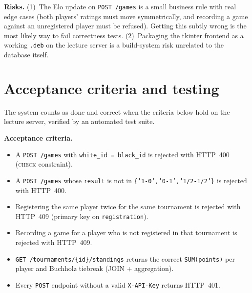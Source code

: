 \documentclass[11pt,a4paper]{article}
\begin{document}
\textbf{Risks.} (1)~The Elo update on \texttt{POST /games} is a small business
rule with real edge cases (both players' ratings must move symmetrically, and
recording a game against an unregistered player must be refused). Getting this
subtly wrong is the most likely way to fail correctness tests.
(2)~Packaging the tkinter frontend as a working \texttt{.deb} on the lecture
server is a build-system risk unrelated to the database itself.

\section{Acceptance criteria and testing}

The system counts as done and correct when the criteria below hold on the
lecture server, verified by an automated test suite.

\textbf{Acceptance criteria.}
\begin{itemize}[topsep=2pt]
  \item A \texttt{POST /games} with \texttt{white\_id = black\_id} is rejected
        with HTTP~400 (\textsc{check} constraint).
  \item A \texttt{POST /games} whose \texttt{result} is not in
        \texttt{\{'1-0','0-1','1/2-1/2'\}} is rejected with HTTP~400.
  \item Registering the same player twice for the same tournament is rejected
        with HTTP~409 (primary key on \texttt{registration}).
  \item Recording a game for a player who is not registered in that
        tournament is rejected with HTTP~409.
  \item \texttt{GET /tournaments/\{id\}/standings} returns the correct
        \texttt{SUM(points)} per player and Buchholz tiebreak (JOIN +
        aggregation).
  \item Every \texttt{POST} endpoint without a valid \texttt{X-API-Key}
        returns HTTP~401.
\end{itemize}
\end{document}
